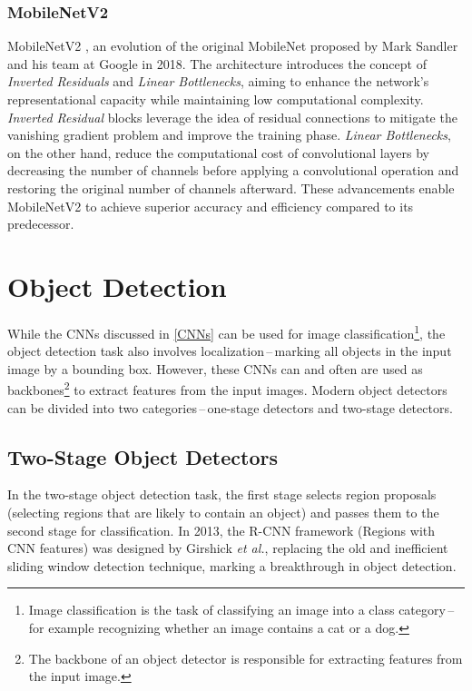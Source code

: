 \subsubsection{MobileNetV2}

MobileNetV2 \cite{Sandler2018}, an evolution of the original MobileNet
proposed by Mark Sandler and his team at Google in 2018. The architecture
introduces the concept of \textit{Inverted Residuals} and \textit{Linear
Bottlenecks}, aiming to enhance the network's representational capacity while
maintaining low computational complexity. \textit{Inverted Residual} blocks
leverage the idea of residual connections to mitigate the vanishing gradient
problem and improve the training phase. \textit{Linear Bottlenecks}, on the
other hand, reduce the computational cost of convolutional layers by decreasing
the number of channels before applying a convolutional operation and restoring
the original number of channels afterward. These advancements enable MobileNetV2
to achieve superior accuracy and efficiency compared to its predecessor.


\section{Object Detection}

While the CNNs discussed in \autoref{CNNs} can be used for image
classification\footnote{Image classification is the task of classifying an image
into a class category\,--\,for example recognizing whether an image contains a
cat or a dog.}, the object detection task also involves
localization\,--\,marking all objects in the input image by a bounding box.
However, these CNNs can and often are used as backbones\footnote{The backbone of an object detector is responsible for extracting
features from the input image.} to extract features from
the input images. Modern object detectors can be divided into two
categories\,--\,one-stage detectors and two-stage detectors.


\subsection{Two-Stage Object Detectors}

In the two-stage object detection task, the first stage selects region proposals
(selecting regions that are likely to contain an object) and passes them to the
second stage for classification. In 2013, the R-CNN framework
\cite{Girshick2013} (Regions with CNN features) was designed by Girshick
\textit{et al.}, replacing the old and inefficient sliding window detection
technique, marking a breakthrough in object detection. \cite{Li2022}

